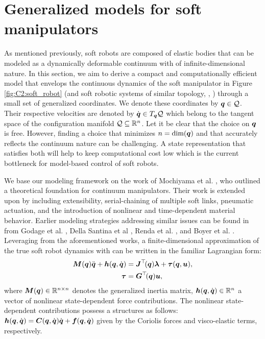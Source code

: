 \section{Generalized models for soft manipulators}
\label{sec: chap2 section header}
As mentioned previously, soft robots are composed of elastic bodies that can be  modeled as a dynamically deformable continuum with of infinite-dimensional nature. In this section, we aim to derive a compact and computationally efficient model that envelops the continuous dynamics of  the soft manipulator in Figure \ref{fig:C2:soft_robot} (and soft robotic systems of similar topology, \eg, \cite{Katzschmann2018,Falkenhahn2015,BibEntryOrm2019Sep}) through a  small set of generalized coordinates. We denote these coordinates by ${\boldsymbol{q}}\in\mathcal{Q}$. Their respective velocities are denoted by ${\dot{\boldsymbol{q}}}\in T_{{\boldsymbol{q}}}\mathcal{Q}$ which belong to the tangent space of the configuration manifold $\mathcal{Q} \subseteq \mathbb{R}^n$.  Let it be clear that the choice on ${\boldsymbol{q}}$ is free. However, finding a choice that minimizes $n = \text{dim}({\boldsymbol{q}})$ and that accurately reflects the continuum nature can be challenging. A state representation that satisfies both will help to keep computational cost low which is the current bottleneck for model-based control of soft robots. 

We base our modeling framework on the work of Mochiyama et al. \cite{Mochiyama2003}, who outlined a theoretical foundation for continuum manipulators. Their work is extended upon by including extensibility, serial-chaining of multiple soft links, pneumatic actuation, and the introduction of nonlinear and time-dependent material behavior. Earlier modeling strategies addressing similar issues can be found in from Godage et al. \cite{Godage2015,Godage2016}, Della Santina et al \cite{DellaSantina2020,DellaSantina2020a,DellaSantina2021}, Renda et al.
\cite{Renda2018}, and Boyer et al. \cite{Boyer2021}. Leveraging from the aforementioned works, a  finite-dimensional approximation of the true soft robot dynamics with  can be written in the familiar Lagrangian form:
%
\begin{align}
{\boldsymbol{M}}({\boldsymbol{q}}) {\ddot{\boldsymbol{q}}} + \boldsymbol{h}({\boldsymbol{q}},{\dot{\boldsymbol{q}}}) & = \boldsymbol{J}^\top\!({\boldsymbol{q}}) \boldsymbol{\lambda} + \boldsymbol{\tau}({\boldsymbol{q}},\boldsymbol{u}), \label{eq:C2:model0}\\
\boldsymbol{\tau} & = \boldsymbol{G}^\top\!({\boldsymbol{q}}) \boldsymbol{u},
\label{eq:C2:input_model0}
\end{align}
%
where ${\boldsymbol{M}}({\boldsymbol{q}}) \in \mathbb{R}^{n\times n}$ denotes the generalized inertia matrix, $\boldsymbol{h}({\boldsymbol{q}},{\dot{\boldsymbol{q}}}) \in \mathbb{R}^n$ a vector of nonlinear state-dependent force contributions. The nonlinear state-dependent contributions possess a structures as follows: $\boldsymbol{h}({\boldsymbol{q}},{\dot{\boldsymbol{q}}}) = \boldsymbol{C}({\boldsymbol{q}},{\dot{\boldsymbol{q}}}){\dot{\boldsymbol{q}}} + \boldsymbol{f}({\boldsymbol{q}},{\dot{\boldsymbol{q}}})$  given by the Coriolis forces and visco-elastic terms, respectively.


